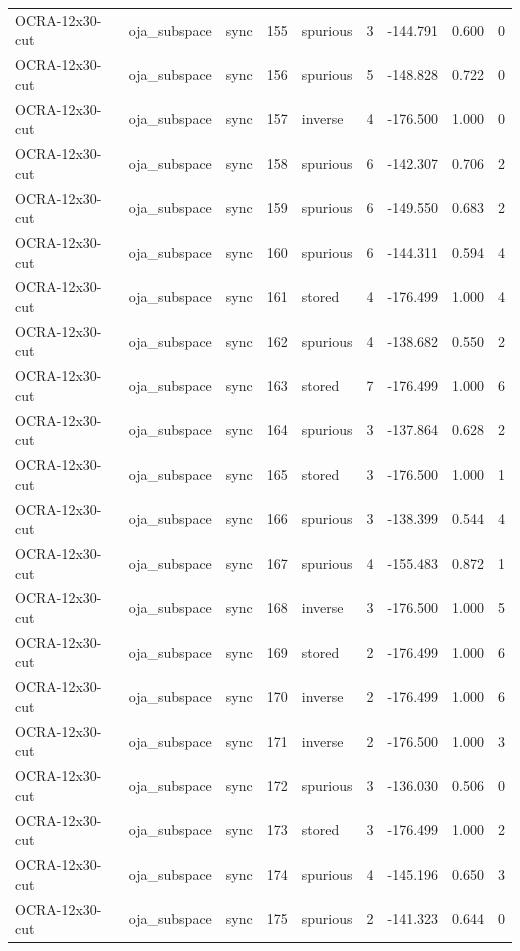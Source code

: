 \begin{tabular}{lllrlrrrr}
OCRA-12x30-cut & oja\_subspace & sync & 155 & spurious & 3 & -144.791 & 0.600 & 0 \\
OCRA-12x30-cut & oja\_subspace & sync & 156 & spurious & 5 & -148.828 & 0.722 & 0 \\
OCRA-12x30-cut & oja\_subspace & sync & 157 & inverse & 4 & -176.500 & 1.000 & 0 \\
OCRA-12x30-cut & oja\_subspace & sync & 158 & spurious & 6 & -142.307 & 0.706 & 2 \\
OCRA-12x30-cut & oja\_subspace & sync & 159 & spurious & 6 & -149.550 & 0.683 & 2 \\
OCRA-12x30-cut & oja\_subspace & sync & 160 & spurious & 6 & -144.311 & 0.594 & 4 \\
OCRA-12x30-cut & oja\_subspace & sync & 161 & stored & 4 & -176.499 & 1.000 & 4 \\
OCRA-12x30-cut & oja\_subspace & sync & 162 & spurious & 4 & -138.682 & 0.550 & 2 \\
OCRA-12x30-cut & oja\_subspace & sync & 163 & stored & 7 & -176.499 & 1.000 & 6 \\
OCRA-12x30-cut & oja\_subspace & sync & 164 & spurious & 3 & -137.864 & 0.628 & 2 \\
OCRA-12x30-cut & oja\_subspace & sync & 165 & stored & 3 & -176.500 & 1.000 & 1 \\
OCRA-12x30-cut & oja\_subspace & sync & 166 & spurious & 3 & -138.399 & 0.544 & 4 \\
OCRA-12x30-cut & oja\_subspace & sync & 167 & spurious & 4 & -155.483 & 0.872 & 1 \\
OCRA-12x30-cut & oja\_subspace & sync & 168 & inverse & 3 & -176.500 & 1.000 & 5 \\
OCRA-12x30-cut & oja\_subspace & sync & 169 & stored & 2 & -176.499 & 1.000 & 6 \\
OCRA-12x30-cut & oja\_subspace & sync & 170 & inverse & 2 & -176.499 & 1.000 & 6 \\
OCRA-12x30-cut & oja\_subspace & sync & 171 & inverse & 2 & -176.500 & 1.000 & 3 \\
OCRA-12x30-cut & oja\_subspace & sync & 172 & spurious & 3 & -136.030 & 0.506 & 0 \\
OCRA-12x30-cut & oja\_subspace & sync & 173 & stored & 3 & -176.499 & 1.000 & 2 \\
OCRA-12x30-cut & oja\_subspace & sync & 174 & spurious & 4 & -145.196 & 0.650 & 3 \\
OCRA-12x30-cut & oja\_subspace & sync & 175 & spurious & 2 & -141.323 & 0.644 & 0 \\

\end{tabular}
